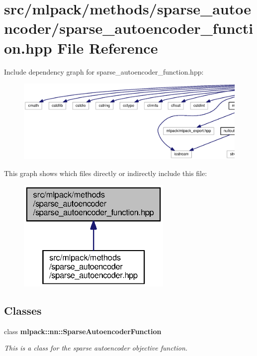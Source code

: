 \section{src/mlpack/methods/sparse\+\_\+autoencoder/sparse\+\_\+autoencoder\+\_\+function.hpp File Reference}
\label{sparse__autoencoder__function_8hpp}
Include dependency graph for sparse\+\_\+autoencoder\+\_\+function.\+hpp\+:
\nopagebreak
\begin{figure}[H]
\begin{center}
\leavevmode
\includegraphics[width=350pt]{sparse__autoencoder__function_8hpp__incl}
\end{center}
\end{figure}
This graph shows which files directly or indirectly include this file\+:
\nopagebreak
\begin{figure}[H]
\begin{center}
\leavevmode
\includegraphics[width=210pt]{sparse__autoencoder__function_8hpp__dep__incl}
\end{center}
\end{figure}
\subsection*{Classes}
\begin{DoxyCompactItemize}
\item 
class {\bf mlpack\+::nn\+::\+Sparse\+Autoencoder\+Function}
\begin{DoxyCompactList}\small\item\em This is a class for the sparse autoencoder objective function. \end{DoxyCompactList}\end{DoxyCompactItemize}
